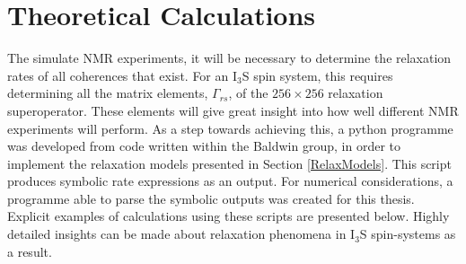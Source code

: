 
\allowdisplaybreaks
\chapter{Theoretical Calculations}
The simulate NMR experiments, it will be necessary to determine the relaxation rates of all coherences that exist. For an I$_3$S spin system, this requires determining all the matrix elements, $\Gamma_{rs}$, of the $256 \times 256$ relaxation superoperator. These elements will give great insight into how well different NMR experiments will perform. As a step towards achieving this, a python programme was developed from code written within the Baldwin group, in order to implement the relaxation models presented in Section \ref{RelaxModels}. This script produces symbolic rate expressions as an output. For numerical considerations, a programme able to parse the symbolic outputs was created for this thesis. Explicit examples of calculations using these scripts are presented below. Highly detailed insights can be made about relaxation phenomena in I$_3$S spin-systems as a result.
